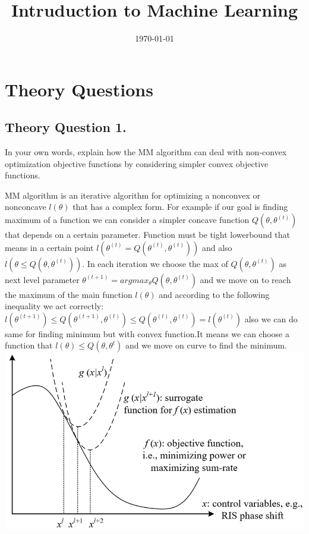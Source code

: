 \documentclass[12pt]{article}
\title{Intruduction to Machine Learning}
\date{\today}
\begin{document}
\maketitlepage
\maketitlestart

\section{Theory Questions}
\subsection{Theory Question 1.}
In your own words, explain how the MM algorithm can deal with non-convex optimization objective functions by considering simpler convex objective functions.
\begin{qsolve}[solution]
    MM algorithm is an iterative algorithm for optimizing a nonconvex or nonconcave $l(\theta)$ that has a complex form. For example if our goal is finding maximum of a function we can consider a simpler concave function $Q(\theta,\theta^{(t)})$ that depends on a certain parameter. Function must be tight lowerbound that means in a certain point $l(\theta^{(t)}=Q(\theta^{(t)},\theta^{(t)}))$ and also $l(\theta\leq Q(\theta,\theta^{(t)}))$. In each iteration we choose the max of $Q(\theta,\theta^{(t)})$ as next level parameter $\theta^{(t+1)}=argmax_{\theta}Q(\theta,\theta^{(t)})$ and we move on to reach the maximum of the main function $l(\theta)$ and according to the following inequality
    we act correctly:
    \\$l(\theta^{(t+1)})\leq Q(\theta^{(t+1)},\theta^{(t)})\leq Q(\theta^{(t)},\theta^{(t)})=l(\theta^{(t)})$
        also we can do same for finding minimum but with convex function.It means we can choose a function that $l(\theta)\leq Q(\theta,\theta^t)$ and we move on curve to find the minimum.\\
    \includegraphics[scale=0.5]{outputs/pic1.png}
\end{qsolve}
\end{document}
